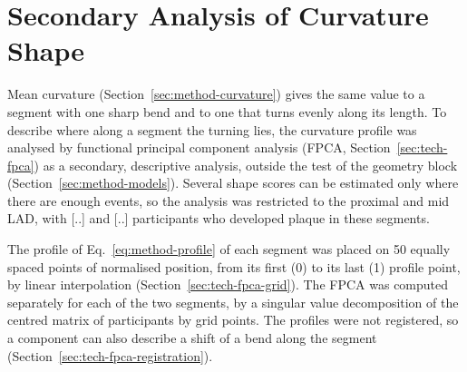 \providecommand{\clarify}[1]{\textcolor{red}{\textbf{Clarification needed:} #1}}
\section{Secondary Analysis of Curvature Shape}
\label{sec:method-fpca}

Mean curvature (Section~\ref{sec:method-curvature}) gives the same value to a segment with one sharp bend and to one that turns evenly along its length.
To describe where along a segment the turning lies, the curvature profile was analysed by functional principal component analysis (FPCA, Section~\ref{sec:tech-fpca}) as a secondary, descriptive analysis, outside the test of the geometry block (Section~\ref{sec:method-models}).
Several shape scores can be estimated only where there are enough events, so the analysis was restricted to the proximal and mid LAD, with [..] and [..] participants who developed plaque in these segments.

The profile of Eq.~\eqref{eq:method-profile} of each segment was placed on 50 equally spaced points of normalised position, from its first (0) to its last (1) profile point, by linear interpolation (Section~\ref{sec:tech-fpca-grid}).
The FPCA was computed separately for each of the two segments, by a singular value decomposition of the centred matrix of participants by grid points.
The profiles were not registered, so a component can also describe a shift of a bend along the segment (Section~\ref{sec:tech-fpca-registration}).


